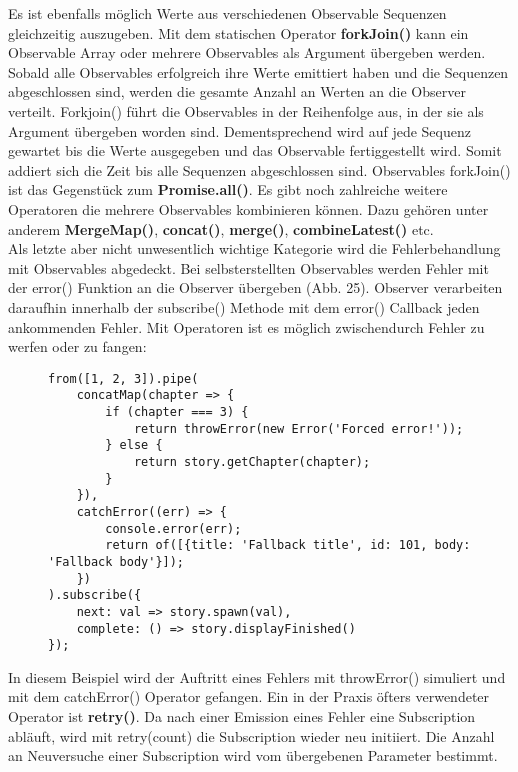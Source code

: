 \noindent
Es ist ebenfalls möglich Werte aus verschiedenen Observable Sequenzen gleichzeitig auszugeben. Mit dem statischen Operator \textbf{forkJoin()} kann ein Observable Array oder mehrere Observables als Argument übergeben werden. Sobald alle Observables erfolgreich ihre Werte emittiert haben und die Sequenzen abgeschlossen sind, werden die gesamte Anzahl an Werten an die Observer verteilt. Forkjoin() führt die Observables in der Reihenfolge aus, in der sie als Argument übergeben worden sind. Dementsprechend wird auf jede Sequenz gewartet bis die Werte ausgegeben und das Observable fertiggestellt wird. Somit addiert sich die Zeit bis alle Sequenzen abgeschlossen sind. Observables forkJoin() ist das Gegenstück zum \textbf{Promise.all()}. Es gibt noch zahlreiche weitere Operatoren die mehrere Observables kombinieren können. Dazu gehören unter anderem \textbf{MergeMap()}, \textbf{concat()}, \textbf{merge()}, \textbf{combineLatest()} etc.\\


\noindent
Als letzte aber nicht unwesentlich wichtige Kategorie wird die Fehlerbehandlung mit Observables abgedeckt. Bei selbsterstellten Observables werden Fehler mit der error() Funktion an die Observer übergeben (Abb. 25). Observer verarbeiten daraufhin innerhalb der subscribe() Methode mit dem error() Callback jeden ankommenden Fehler. Mit Operatoren ist es möglich zwischendurch Fehler zu werfen oder zu fangen:

\begin{figure}[H]
\begin{lstlisting}[basicstyle=\small]
from([1, 2, 3]).pipe(
    concatMap(chapter => {
        if (chapter === 3) {
            return throwError(new Error('Forced error!'));
        } else {
            return story.getChapter(chapter);
        }
    }),
    catchError((err) => {
        console.error(err);
        return of([{title: 'Fallback title', id: 101, body: 'Fallback body'}]);
    })
).subscribe({
    next: val => story.spawn(val),
    complete: () => story.displayFinished()
});
\end{lstlisting}
\end{figure}

\noindent
In diesem Beispiel wird der Auftritt eines Fehlers mit throwError() simuliert und mit dem catchError() Operator gefangen. Ein in der Praxis öfters verwendeter Operator ist \textbf{retry()}. Da nach einer Emission eines Fehler eine Subscription abläuft, wird mit retry(count) die Subscription wieder neu initiiert. Die Anzahl an Neuversuche einer Subscription wird vom übergebenen Parameter bestimmt.\\

